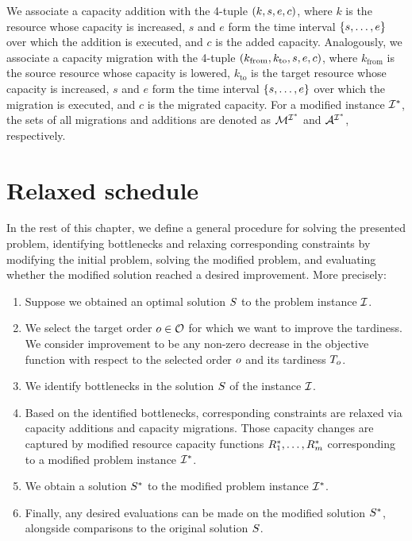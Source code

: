 We associate a capacity addition with the 4-tuple $(k, s, e, c)$, where
$k$ is the resource whose capacity is increased,
$s$ and $e$ form the time interval $\{{s}, \dots, {e}\}$ over which the addition is executed, and
$c$ is the added capacity.
Analogously, we associate a capacity migration
with the 4-tuple $(k_{\text{from}}, k_{\text{to}}, s, e, c)$, where
$k_{\text{from}}$ is the source resource whose capacity is lowered,
$k_{\text{to}}$ is the target resource whose capacity is increased,
$s$ and $e$ form the time interval $\{{s}, \dots, {e}\}$ over which the migration is executed, and
$c$ is the migrated capacity.
For a modified instance $\mathcal{I}^*$, the sets of all migrations and additions are denoted as
$\mathcal{M}^{\mathcal{I}^*}$ and $\mathcal{A}^{\mathcal{I}^*}$, respectively.

\section{Relaxed schedule} \label{sec:problem-statement/relaxed-schedule}

In the rest of this chapter, we define a general procedure for solving the presented problem,
identifying bottlenecks and relaxing corresponding constraints by modifying the initial problem,
solving the modified problem,
and evaluating whether the modified solution reached a desired improvement.
More precisely:

\begin{enumerate}
    \item Suppose we obtained an optimal solution $S$ to the problem instance $\mathcal{I}$.

    \item We select the target order $o \in \mathcal{O}$ for which we want to improve the tardiness.
        We consider improvement to be any non-zero decrease in the objective function with respect to the
        selected order $o$ and its tardiness $T_{o}$.

    \item We identify bottlenecks in the solution $S$ of the instance $\mathcal{I}$.

    \item Based on the identified bottlenecks, corresponding constraints are relaxed via
        capacity additions and capacity migrations.
        Those capacity changes are captured by modified resource capacity functions
        $R_{1}^*, \ldots, R_{m}^*$
        corresponding to a modified problem instance $\mathcal{I}^*$.

    \item We obtain a solution $S^*$ to the modified problem instance $\mathcal{I}^*$.

    \item Finally, any desired evaluations can be made on the modified solution $S^*$,
        alongside comparisons to the original solution $S$.
\end{enumerate}

